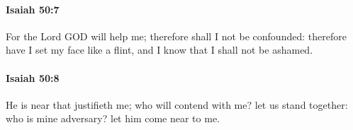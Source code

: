 		\paragraph{Isaiah 50:7} %
			\label{ISAIAH-50-7}

			For the Lord GOD will help me; therefore shall I not be confounded: therefore have I set my face like a flint, and I know that I shall not be ashamed.


		\paragraph{Isaiah 50:8} %
			\label{ISAIAH-50-8}

			He is near that justifieth me; who will contend with me? let us stand together: who is mine adversary? let him come near to me.


